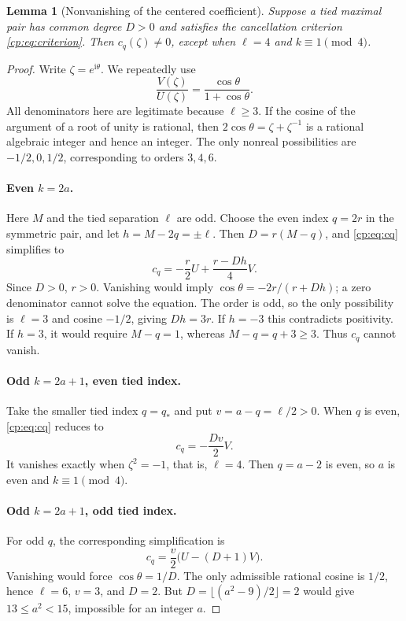 \documentclass[11pt]{article}
\newtheorem{lemma}[theorem]{Lemma}
\theoremstyle{definition}
\theoremstyle{remark}
\newcommand{\ii}{\mathrm i}
\theoremstyle{definition}
\theoremstyle{plain}
\numberwithin{equation}{section}
\begin{document}
\begin{lemma}[Nonvanishing of the centered coefficient]
\label{cp:lem:nonzero}
Suppose a tied maximal pair has common degree $D>0$ and satisfies the
cancellation criterion \eqref{cp:eq:criterion}. Then $c_q(\zeta)\ne0$,
except when $\ell=4$ and $k\equiv1\pmod4$.
\end{lemma}
\begin{proof}
Write $\zeta=e^{\ii\theta}$. We repeatedly use
\begin{equation}
 \frac{V(\zeta)}{U(\zeta)}=\frac{\cos\theta}{1+\cos\theta}.
 \label{cp:eq:cosratio}
\end{equation}
All denominators here are legitimate because $\ell\ge3$.
If the cosine of the argument of a root of unity is rational, then
$2\cos\theta=\zeta+\zeta^{-1}$ is a rational algebraic integer and
hence an integer. The only nonreal possibilities are $-1/2,0,1/2$,
corresponding to orders $3,4,6$.

\paragraph{Even $k=2a$.}
Here $M$ and the tied separation $\ell$ are odd. Choose the even index
$q=2r$ in the symmetric pair, and let $h=M-2q=\pm\ell$.
Then $D=r(M-q)$, and \eqref{cp:eq:cq} simplifies to
\begin{equation}
 c_q=-\frac r2 U+\frac{r-Dh}{4}V.
 \label{cp:eq:ceven}
\end{equation}
Since $D>0$, $r>0$. Vanishing would imply
$\cos\theta=-2r/(r+Dh)$; a zero denominator cannot solve the equation.
The order is odd, so the only possibility is $\ell=3$ and cosine
$-1/2$, giving $Dh=3r$. If $h=-3$ this contradicts positivity.
If $h=3$, it would require $M-q=1$, whereas
$M-q=q+3\ge3$. Thus $c_q$ cannot vanish.

\paragraph{Odd $k=2a+1$, even tied index.}
Take the smaller tied index $q=q_*$ and put $v=a-q=\ell/2>0$.
When $q$ is even, \eqref{cp:eq:cq} reduces to
\begin{equation}
 c_q=-\frac{Dv}{2}V.
 \label{cp:eq:coddeven}
\end{equation}
It vanishes exactly when $\zeta^2=-1$, that is, $\ell=4$.
Then $q=a-2$ is even, so $a$ is even and $k\equiv1\pmod4$.

\paragraph{Odd $k=2a+1$, odd tied index.}
For odd $q$, the corresponding simplification is
\begin{equation}
 c_q=\frac v2\bigl(U-(D+1)V\bigr).
 \label{cp:eq:coddodd}
\end{equation}
Vanishing would force $\cos\theta=1/D$. The only admissible rational
cosine is $1/2$, hence $\ell=6$, $v=3$, and $D=2$.
But $D=\lfloor(a^2-9)/2\rfloor=2$ would give
$13\le a^2<15$, impossible for an integer $a$.
\end{proof}
\end{document}
